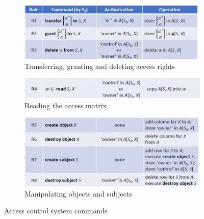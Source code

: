 \documentclass{article}
\begin{document}
                            \begin{figure}[h]
                                \centering
                                \begin{subfigure}
                                    \centering
                                    \includegraphics[scale=0.4]{../immagini/trasfering.png}
                                    \caption{Transferring, granting
                                    and deleting access
                                    rights}
                                    \label{fig:sub1}
                                \end{subfigure}
                                \hspace{1cm} %
                                \begin{subfigure}
                                    \centering
                                    \includegraphics[scale=0.4]{../immagini/read.png}
                                    \caption{Reading the access
                                    matrix}
                                    \label{fig:sub2}
                                \end{subfigure}
                                \hspace{1cm} %
                                \begin{subfigure}
                                    \centering
                                    \includegraphics[scale=0.4]{../immagini/manipulating.png}
                                    \caption{Manipulating objects
                                    and subjects}
                                    \label{fig:sub3}
                                \end{subfigure}
                                \caption{Access control
                                system commands}
                                \label{fig:general}
                            \end{figure}
                        \newpage
\end{document}

